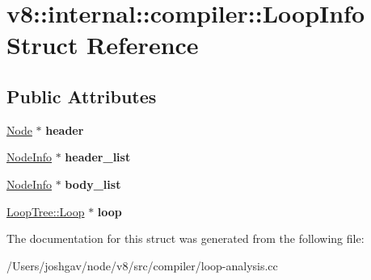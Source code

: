 \hypertarget{structv8_1_1internal_1_1compiler_1_1_loop_info}{}\section{v8\+:\+:internal\+:\+:compiler\+:\+:Loop\+Info Struct Reference}
\label{structv8_1_1internal_1_1compiler_1_1_loop_info}
\subsection*{Public Attributes}
\begin{DoxyCompactItemize}
\item 
\hyperlink{classv8_1_1internal_1_1compiler_1_1_node}{Node} $\ast$ {\bfseries header}\hypertarget{structv8_1_1internal_1_1compiler_1_1_loop_info_acd86f0116181a6dd3fca288e7ade98c5}{}\label{structv8_1_1internal_1_1compiler_1_1_loop_info_acd86f0116181a6dd3fca288e7ade98c5}

\item 
\hyperlink{structv8_1_1internal_1_1compiler_1_1_node_info}{Node\+Info} $\ast$ {\bfseries header\+\_\+list}\hypertarget{structv8_1_1internal_1_1compiler_1_1_loop_info_aff3f7f3a56a8ef8db57de6f87c7f5697}{}\label{structv8_1_1internal_1_1compiler_1_1_loop_info_aff3f7f3a56a8ef8db57de6f87c7f5697}

\item 
\hyperlink{structv8_1_1internal_1_1compiler_1_1_node_info}{Node\+Info} $\ast$ {\bfseries body\+\_\+list}\hypertarget{structv8_1_1internal_1_1compiler_1_1_loop_info_a8aa3cf466c9dabc5caa5800312172aab}{}\label{structv8_1_1internal_1_1compiler_1_1_loop_info_a8aa3cf466c9dabc5caa5800312172aab}

\item 
\hyperlink{classv8_1_1internal_1_1compiler_1_1_loop_tree_1_1_loop}{Loop\+Tree\+::\+Loop} $\ast$ {\bfseries loop}\hypertarget{structv8_1_1internal_1_1compiler_1_1_loop_info_a2a7c04314b2febd9c247ba9b50a6371d}{}\label{structv8_1_1internal_1_1compiler_1_1_loop_info_a2a7c04314b2febd9c247ba9b50a6371d}

\end{DoxyCompactItemize}


The documentation for this struct was generated from the following file\+:\begin{DoxyCompactItemize}
\item 
/\+Users/joshgav/node/v8/src/compiler/loop-\/analysis.\+cc\end{DoxyCompactItemize}
